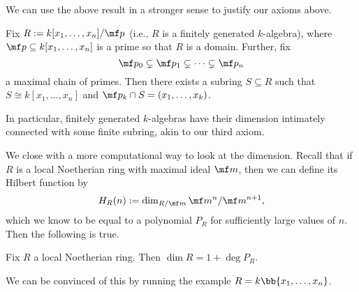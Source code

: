 \documentclass[../notes.tex]{subfiles}
\begin{document}
We can use the above result in a stronger sense to justify our axioms above.
\begin{theorem}
	Fix $R:=k[x_1,\ldots,x_n]/\mf p$ (i.e., $R$ is a finitely generated $k$-algebra), where $\mf p\subseteq k[x_1,\ldots,x_n]$ is a prime so that $R$ is a domain. Further, fix
	\[\mf p_0\subsetneq\mf p_1\subsetneq\cdots\subsetneq\mf p_n\]
	a maximal chain of primes. Then there exists a subring $S\subseteq R$ such that $S\cong k[x_1,\ldots,x_n]$ and $\mf p_k\cap S=(x_1,\ldots,x_k)$.  
\end{theorem}
In particular, finitely generated $k$-algebras have their dimension intimately connected with some finite subring, akin to our third axiom.

We close with a more computational way to look at the dimension. Recall that if $R$ is a local Noetherian ring with maximal ideal $\mf m$, then we can define its Hilbert function by
\[H_R(n):=\dim_{R/\mf m}\mf m^n/\mf m^{n+1},\]
which we know to be equal to a polynomial $P_R$ for sufficiently large values of $n$. Then the following is true.
\begin{theorem}
	Fix $R$ a local Noetherian ring. Then $\dim R=1+\deg P_R$.
\end{theorem}
We can be convinced of this by running the example $R=k\bb{x_1,\ldots,x_n}$.
\end{document}
